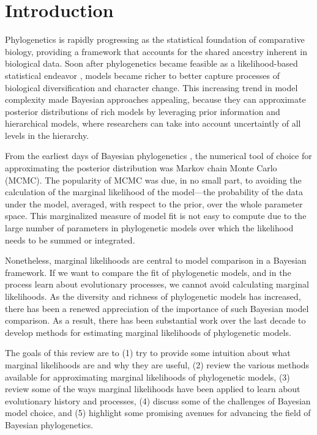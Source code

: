 \section{Introduction}

Phylogenetics is rapidly progressing as the statistical foundation of
comparative biology, providing a framework that accounts for the shared
ancestry inherent in biological data.
Soon after phylogenetics became feasible as a likelihood-based statistical
endeavor \citep{Felsenstein1981}, models became richer to better
capture processes of biological diversification and character change.
This increasing trend in model complexity made Bayesian approaches appealing,
because they can approximate posterior distributions of rich models by
leveraging prior information and hierarchical models, where researchers can
take into account uncertaintly of all levels in the hierarchy.

From the earliest days of Bayesian phylogenetics \citep{Rannala1996,Mau1997},
the numerical tool of choice for approximating the posterior distribution was
Markov chain Monte Carlo (MCMC).
The popularity of MCMC was due, in no small part, to avoiding the calculation
of the marginal likelihood of the model---the probability of the data under the
model, averaged, with respect to the prior, over the whole parameter space.
This marginalized measure of model fit is not easy to compute due to the large
number of parameters in phylogenetic models over which the likelihood needs to
be summed or integrated. 

Nonetheless, marginal likelihoods are central to model comparison in a Bayesian
framework.
If we want to compare the fit of phylogenetic models, and in the process learn
about evolutionary processes, we cannot avoid calculating marginal likelihoods.
As the diversity and richness of phylogenetic models has increased, there has
been a renewed appreciation of the importance of such Bayesian model
comparison.
As a result, there has been substantial work over the last decade to develop
methods for estimating marginal likelihoods of phylogenetic models.

The goals of this review are to
(1) try to provide some intuition about what marginal likelihoods are and why
they are useful,
(2) review the various methods available for approximating marginal likelihoods
of phylogenetic models,
(3) review some of the ways marginal likelihoods have been applied to learn
about evolutionary history and processes,
(4) discuss some of the challenges of Bayesian model choice, and
(5) highlight some promising avenues for advancing the field of Bayesian
phylogenetics.


